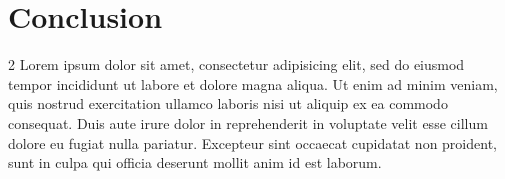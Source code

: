 \documentclass[kulak]{kulakposter}
\begin{document}
\section*{Conclusion}
\begin{multicols}{2}\setlength{\columnseprule}{0pt}
	Lorem ipsum dolor sit amet, consectetur adipisicing elit, sed do eiusmod tempor incididunt ut labore et dolore magna aliqua. Ut enim ad minim veniam, quis nostrud exercitation ullamco laboris nisi ut aliquip ex ea commodo consequat. Duis aute irure dolor in reprehenderit in voluptate velit esse cillum dolore eu fugiat nulla pariatur. Excepteur sint occaecat cupidatat non proident, sunt in culpa qui officia deserunt mollit anim id est laborum.
\end{multicols}
\end{document}
